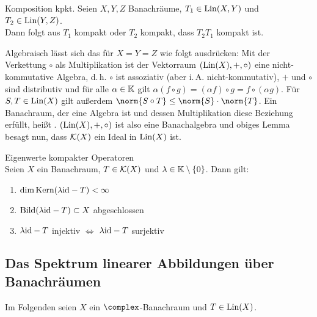 \linie

\begin{Lemma}{Komposition kpkt.}
    Seien $X, Y, Z$ Banachräume, $T_1 \in \operatorname{Lin}(X, Y)$ und $T_2 \in \operatorname{Lin}(Y, Z)$.\\
    Dann folgt aus $T_1$ kompakt oder $T_2$ kompakt, dass $T_2 T_1$ kompakt ist.
\end{Lemma}

\begin{Bem}
    Algebraisch lässt sich das für $X = Y = Z$ wie folgt ausdrücken:
    Mit der Verkettung $\circ$ als Multiplikation ist der Vektorraum
    $(\operatorname{Lin}(X), +, \circ)$ eine nicht-kommutative Algebra,
    d.\,h. $\circ$ ist assoziativ (aber i.\,A. nicht-kommutativ),
    $+$ und $\circ$ sind distributiv und für alle $\alpha \in \mathbb{K}$ gilt
    $\alpha (f \circ g) = (\alpha f) \circ g = f \circ (\alpha g)$.
    Für $S, T \in \operatorname{Lin}(X)$ gilt außerdem $\norm{S \circ T} \le \norm{S} \cdot \norm{T}$.
    Ein Banachraum, der eine Algebra ist und dessen Multiplikation diese Beziehung erfüllt,
    heißt .
    $(\operatorname{Lin}(X), +, \circ)$ ist also eine Banachalgebra und obiges Lemma besagt nun,
    dass $\mathcal{K}(X)$ ein Ideal in $\operatorname{Lin}(X)$ ist.
\end{Bem}

\linie

\begin{Satz}{Eigenwerte kompakter Operatoren}\\
    Seien $X$ ein Banachraum, $T \in \mathcal{K}(X)$ und $\lambda \in \mathbb{K} \setminus \{0\}$.
    Dann gilt:
    \begin{enumerate}
        \item
        $\dim \text{Kern}(\lambda\text{id} - T) < \infty$
        
        \item
        $\text{Bild}(\lambda\text{id} - T) \subset X$ abgeschlossen
        
        \item
        $\lambda\text{id} - T$ injektiv $\iff$ $\lambda\text{id} - T$ surjektiv
    \end{enumerate}
\end{Satz}

\pagebreak

\subsection{%
    Das Spektrum linearer Abbildungen über Banachräumen%
}

\begin{Bem}
    Im Folgenden seien $X$ ein $\complex$-Banachraum und $T \in \operatorname{Lin}(X)$.
\end{Bem}

